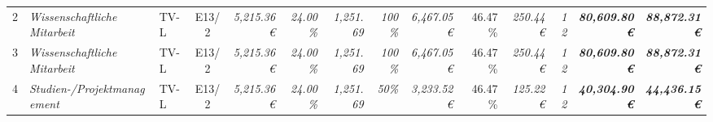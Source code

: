 \begin{table}[]
\begin{tabular}{clllcrrrrrrrrrr}
2                                                                                       & \multicolumn{2}{l}{\cellcolor[HTML]{FFFF99}\textit{Wissenschaftliche Mitarbeit}}      & \cellcolor[HTML]{FFFF99}TV-L      & \cellcolor[HTML]{FFFF99}E13/2                & \cellcolor[HTML]{FFFF99}\textit{5,215.36 €}         & \textit{24.00\%}                                      & \textit{1,251.69}                            & \cellcolor[HTML]{FFFF99}\textit{100\%}                  & \cellcolor[HTML]{92D050}\textit{6,467.05 €}  & 46.47 \%                                       & \cellcolor[HTML]{92D050}\textit{250.44 €}    & \cellcolor[HTML]{FFFF99}\textit{12}          & \cellcolor[HTML]{BFBFBF}\textit{\textbf{80,609.80 €}}           & \textit{\textbf{88,872.31 €}}                                                                 \\
3                                                                                       & \multicolumn{2}{l}{\cellcolor[HTML]{FFFF99}\textit{Wissenschaftliche Mitarbeit}}      & \cellcolor[HTML]{FFFF99}TV-L      & \cellcolor[HTML]{FFFF99}E13/2                & \cellcolor[HTML]{FFFF99}\textit{5,215.36 €}         & \textit{24.00\%}                                      & \textit{1,251.69}                            & \cellcolor[HTML]{FFFF99}\textit{100\%}                  & \cellcolor[HTML]{92D050}\textit{6,467.05 €}  & 46.47 \%                                       & \cellcolor[HTML]{92D050}\textit{250.44 €}    & \cellcolor[HTML]{FFFF99}\textit{12}          & \cellcolor[HTML]{BFBFBF}\textit{\textbf{80,609.80 €}}           & \textit{\textbf{88,872.31 €}}                                                                 \\
4                                                                                       & \multicolumn{2}{l}{\cellcolor[HTML]{FFFF99}\textit{Studien-/Projektmanagement}}       & \cellcolor[HTML]{FFFF99}TV-L      & \cellcolor[HTML]{FFFF99}E13/2                & \cellcolor[HTML]{FFFF99}\textit{5,215.36 €}         & \textit{24.00\%}                                      & \textit{1,251.69}                            & \cellcolor[HTML]{FFFF99}\textit{50\%}                   & \cellcolor[HTML]{92D050}\textit{3,233.52 €}  & 46.47 \%                                       & \cellcolor[HTML]{92D050}\textit{125.22 €}    & \cellcolor[HTML]{FFFF99}\textit{12}          & \cellcolor[HTML]{BFBFBF}\textit{\textbf{40,304.90 €}}           & \textit{\textbf{44,436.15 €}}                                                                 \\

\end{tabular}
\end{table}
